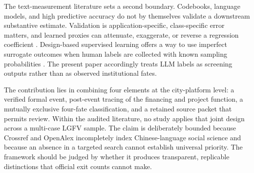 The text-measurement literature sets a second boundary. Codebooks, language
models, and high predictive accuracy do not by themselves validate a downstream
substantive estimate. Validation is application-specific, class-specific error
matters, and learned proxies can attenuate, exaggerate, or reverse a regression
coefficient \citep{grimmer_stewart_2013_text,knox_lucas_cho_2022_proxies,
teblunthuis_hase_chan_2024_misclassification,
halterman_keith_2026_codebook}. Design-based supervised learning offers a way
to use imperfect surrogate outcomes when human labels are collected with known
sampling probabilities \citep{egami2023dsl}. The present paper accordingly
treats LLM labels as screening outputs rather than as observed institutional
fates.

The contribution lies in combining four elements at the city-platform level:
a verified formal event, post-event tracing of the financing and project
function, a mutually exclusive four-fate classification, and a retained source
packet that permits review. Within the audited literature, no study applies
that joint design across a multi-case LGFV sample. The claim is deliberately
bounded because Crossref and OpenAlex incompletely index Chinese-language social
science and because an absence in a targeted search cannot establish universal
priority. The framework should be judged by whether it produces transparent,
replicable distinctions that official exit counts cannot make.
